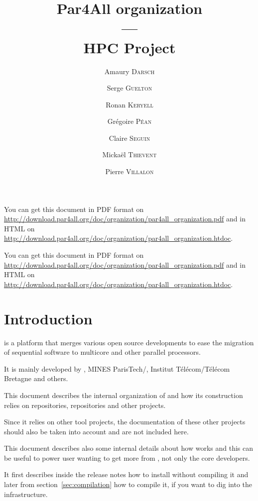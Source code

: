 \documentclass[a4paper]{article}
\newcommand{\LINK}[1]{\url{#1}\xspace}
\newcommand{\PfaOrganizationPDF}{\LINK{http://download.par4all.org/doc/organization/par4all_organization.pdf}}
\newcommand{\PfaAllOrganizationHTDOC}{\LINK{http://download.par4all.org/doc/organization/par4all_organization.htdoc}}
\begin{document}
\title{Par4All organization\\
  ---\\
  HPC Project}

\author{Amaury \textsc{Darsch} \and Serge \textsc{Guelton} \and Ronan
  \textsc{Keryell} \and Grégoire \textsc{Péan} \and Claire \textsc{Seguin}
  \and Mickaël \textsc{Thievent} \and Pierre \textsc{Villalon}}

\maketitle

You can get this document in PDF format on \PfaOrganizationPDF and in HTML
on \PfaAllOrganizationHTDOC.


\bigskip{}

You can get this document in PDF format on \PfaOrganizationPDF and in HTML
on \PfaAllOrganizationHTDOC.


\section{Introduction}
\label{sec:introduction}

\Apfa is a platform that merges various open source developments to ease
the migration of sequential software to multicore and other parallel
processors.

It is mainly developed by \Ahpcp, MINES ParisTech/\Acri, Institut
Télécom/Télécom Bretagne and others.

This document describes the internal organization of \Apfa and how its
construction relies on \Agit repositories, \Asvn repositories and other
projects.

Since it relies on other tool projects, the documentation of these other
projects should also be taken into account and are not included here.

This document describes also some internal details about how \Apfa works
and this can be useful to power user wanting to get more from \Apfa, not
only the \Apfa core developers.

It first describes inside the release notes how to install \Apfa without
compiling it and later from section~\ref{sec:compilation} how to compile
it, if you want to dig into the infrastructure.

\tableofcontents{}

\bigskip{}
\end{document}
